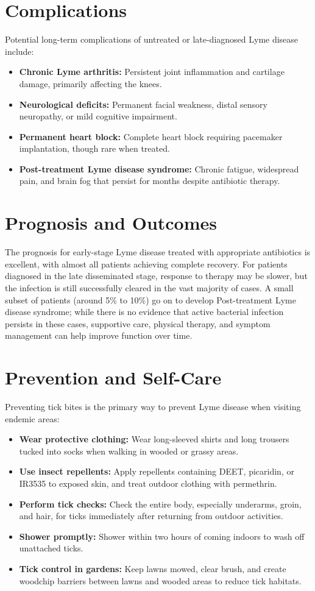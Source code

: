 \section*{Complications}
Potential long-term complications of untreated or late-diagnosed Lyme disease include:
\begin{itemize}
    \item \textbf{Chronic Lyme arthritis:} Persistent joint inflammation and cartilage damage, primarily affecting the knees.
    \item \textbf{Neurological deficits:} Permanent facial weakness, distal sensory neuropathy, or mild cognitive impairment.
    \item \textbf{Permanent heart block:} Complete heart block requiring pacemaker implantation, though rare when treated.
    \item \textbf{Post-treatment Lyme disease syndrome:} Chronic fatigue, widespread pain, and brain fog that persist for months despite antibiotic therapy.
\end{itemize}

\section*{Prognosis and Outcomes}
The prognosis for early-stage Lyme disease treated with appropriate antibiotics is excellent, with almost all patients achieving complete recovery. For patients diagnosed in the late disseminated stage, response to therapy may be slower, but the infection is still successfully cleared in the vast majority of cases. A small subset of patients (around 5\% to 10\%) go on to develop Post-treatment Lyme disease syndrome; while there is no evidence that active bacterial infection persists in these cases, supportive care, physical therapy, and symptom management can help improve function over time.

\section*{Prevention and Self-Care}
Preventing tick bites is the primary way to prevent Lyme disease when visiting endemic areas:
\begin{itemize}
    \item \textbf{Wear protective clothing:} Wear long-sleeved shirts and long trousers tucked into socks when walking in wooded or grassy areas.
    \item \textbf{Use insect repellents:} Apply repellents containing DEET, picaridin, or IR3535 to exposed skin, and treat outdoor clothing with permethrin.
    \item \textbf{Perform tick checks:} Check the entire body, especially underarms, groin, and hair, for ticks immediately after returning from outdoor activities.
    \item \textbf{Shower promptly:} Shower within two hours of coming indoors to wash off unattached ticks.
    \item \textbf{Tick control in gardens:} Keep lawns mowed, clear brush, and create woodchip barriers between lawns and wooded areas to reduce tick habitats.
\end{itemize}

